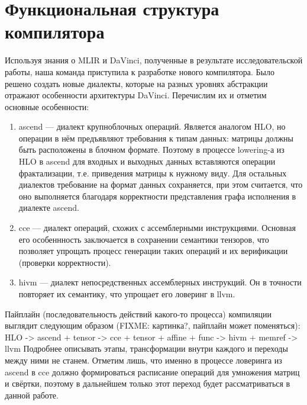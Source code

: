 \section{Функциональная структура компилятора}
\label{sec:Chapter7} 

Используя знания о MLIR и DaVinci, полученные в результате исследовательской
работы, наша команда приступила к разработке нового компилятора. Было решено
создать новые диалекты, которые на разных уровнях абстракции отражают
особенности архитектуры DaVinci. Перечислим их и отметим основные особенности:

\begin{enumerate}
    \item ascend --- диалект крупноблочных операций. Является аналогом HLO, но
          операции в нём предъявляют требования к типам данных: матрицы должны
          быть расположены в блочном формате. Поэтому в процессе lowering-а
          из HLO в ascend для входных и выходных данных вставляются операции
          фрактализации, т.е. приведения матрицы к нужному виду. Для остальных
          диалектов требование на формат данных сохраняется, при этом считается,
          что оно выполняется благодаря корректности представления графа
          исполнения в диалекте ascend.

    \item cce --- диалект операций, схожих с ассемблерными инструкциями.
          Основная его особеннность заключается в сохранении семантики
          тензоров, что позволяет упрощать процесс генерации таких операций и
          их верификации (проверки корректности).

    \item hivm --- диалект непосредственных ассемблерных инструкций. Он в
          точности повторяет их семантику, что упрощает его ловеринг в llvm.
\end{enumerate}

Пайплайн (последовательность действий какого-то процесса) компиляции выглядит
следующим образом (FIXME: картинка?, пайплайн может поменяться):
HLO -> ascend + tensor -> cce + tensor + affine + func -> hivm + memref -> llvm
Подробнее описывать этапы, трансформации внутри каждого и переходы между ними не
станем. Отметим лишь, что именно в процессе ловеринга из ascend в cce должно
формироваться расписание операций для умножения матриц и свёртки, поэтому в
дальнейшем только этот переход будет рассматриваться в данной работе.

\newpage

